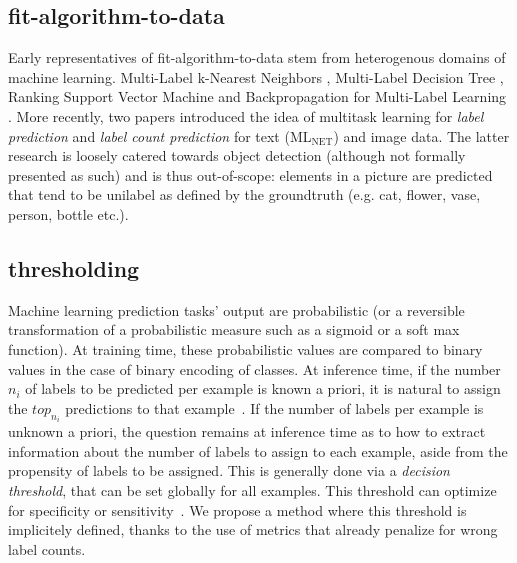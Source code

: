 


\subsection{fit-algorithm-to-data}

Early representatives of fit-algorithm-to-data stem from heterogenous
domains of machine learning. Multi-Label k-Nearest Neighbors \cite{ML-KNN},
Multi-Label Decision Tree \cite{ML-DT}, Ranking Support Vector Machine
\cite{multilabelSVM} and Backpropagation for Multi-Label Learning
\cite{multilabelBackprop}. More recently, two papers introduced the idea of
multitask learning for \emph{label prediction} and \emph{label count
prediction} for text (ML\(_{\text{NET}}\)) \cite{multitaskLabel} and image
\cite{multitaskLabelImages, tencent} data. The latter research is loosely catered
towards object detection (although not formally presented as such) and is thus
out-of-scope: elements in a picture are predicted that tend to be unilabel as
defined by the groundtruth (e.g. cat, flower, vase, person, bottle etc.).


\subsection{thresholding}
\label{subsec:thresh}

Machine learning prediction tasks' output are probabilistic (or a reversible transformation of a probabilistic measure such as a sigmoid or a soft max function). At training time, these probabilistic values are compared to binary values in the case of binary encoding of classes. At inference time, if the number $n_i$ of labels to be predicted per example is known a priori, it is natural to assign the $top_{n_i}$ predictions to that example~\cite{lossTopKError, topKmulticlassSVM}. If the number of labels per example is unknown a priori, the question remains at inference time as to how to extract information about the number of labels to assign to each example, aside from the propensity of labels to be assigned. This is generally done via a \emph{decision threshold}, that can be set globally for all examples. This threshold can optimize for specificity or sensitivity~\cite{decisionThreshold}. We propose a method where this threshold is implicitely defined, thanks to the use of metrics that already penalize for wrong label counts.

